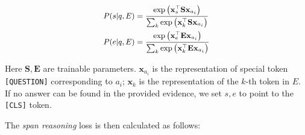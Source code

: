 \documentclass[11pt]{article}
\begin{document}
\vspace{-1em}
\begin{equation}\small{
\begin{aligned}
P(s|q, E)&=\frac{\exp \left(\mathbf{x}_{s}^{\top} \mathbf{S} \mathbf{x}_{a_i}\right)}{\sum_{k} \exp \left(\mathbf{x}_{k}^{\top} \mathbf{S} \mathbf{x}_{a_i}\right)} \\
P(e|q, E)&=\frac{\exp \left(\mathbf{x}_{e}^{\top} \mathbf{E} \mathbf{x}_{a_i}\right)}{\sum_{k} \exp \left(\mathbf{x}_{k}^{\top} \mathbf{E} \mathbf{x}_{a_i}\right)}
\end{aligned}}
\label{eqn:selection}
\end{equation}
\vspace{-0.5em}

Here $\mathbf{S}, \mathbf{E}$ are trainable parameters. $\mathbf{x}_{a_i}$ is the representation of special token \texttt{[QUESTION]} corresponding to $a_i$; $\mathbf{x}_{k}$ is the representation of the $k$-th token in $E$. If no answer can be found in the provided evidence, we set $s,e$ to point to the \texttt{[CLS]} token. 

The \textit{span reasoning} loss is then calculated as follows:
\end{document}
